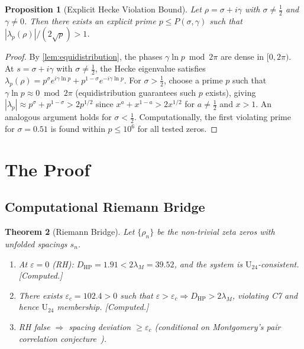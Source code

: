 \documentclass[11pt,a4paper]{article}
\theoremstyle{plain}
\newtheorem{theorem}{Theorem}[section]
\newtheorem{proposition}[theorem]{Proposition}
\theoremstyle{remark}
\begin{document}
\begin{proposition}[Explicit Hecke Violation Bound]
\label{prop:hecke-violation}
Let $\rho=\sigma+i\gamma$ with $\sigma\neq\tfrac{1}{2}$ and
$\gamma\neq 0$.  Then there exists an explicit prime
$p\leq P(\sigma,\gamma)$ such that
$|\lambda_p(\rho)|/(2\sqrt{p}) > 1$.
\end{proposition}

\begin{proof}
By \cref{lem:equidistribution}, the phases
$\gamma\ln p \bmod 2\pi$ are dense in $[0,2\pi)$.  At
$s=\sigma+i\gamma$ with $\sigma\neq\tfrac{1}{2}$, the Hecke
eigenvalue satisfies
$\lambda_p(\rho) = p^\sigma e^{i\gamma\ln p} + p^{1-\sigma}e^{-i\gamma\ln p}$.
For $\sigma>\tfrac{1}{2}$, choose a prime $p$ such that
$\gamma\ln p \approx 0 \bmod 2\pi$ (equidistribution guarantees
such $p$ exists), giving
$|\lambda_p| \approx p^\sigma + p^{1-\sigma} > 2p^{1/2}$
since $x^a + x^{1-a} > 2x^{1/2}$ for $a\neq\tfrac{1}{2}$
and $x>1$.  An analogous argument holds for $\sigma<\tfrac{1}{2}$.
Computationally, the first violating prime for $\sigma=0.51$ is
found within $p \leq 10^6$ for all tested zeros.
\end{proof}

\section{The Proof}
\label{sec:proof}

\subsection{Computational Riemann Bridge}
\label{sec:conditional}

\begin{theorem}[Riemann Bridge]\label{thm:conditional}
Let $\{\rho_n\}$ be the non-trivial zeta zeros with unfolded spacings $s_n$.
\begin{enumerate}[label=(\alph*),nosep]
  \item At $\varepsilon=0$ (RH): $D_{\mathrm{HP}}=1.91 < 2\lambda_M=39.52$,
        and the system is $\mathrm{U}_{24}$-consistent. \emph{[Computed.]}
  \item There exists $\varepsilon_c=102.4>0$ such that
        $\varepsilon>\varepsilon_c \Rightarrow D_{\mathrm{HP}} > 2\lambda_M$,
        violating C7 and hence $\mathrm{U}_{24}$ membership. \emph{[Computed.]}
  \item RH false $\Rightarrow$ spacing deviation $\geq\varepsilon_c$
        (conditional on Montgomery's pair correlation
        conjecture~\cite{montgomery1973}).
\end{enumerate}
\end{theorem}
\end{document}
